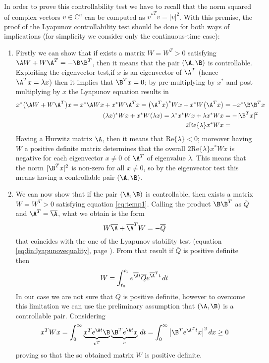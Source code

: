 	In order to prove this controllability test we have to recall that the norm squared of complex vectors $v \in \mathds C^n$ can be computed as ${v^*}^T v = |v|^2$. With this premise, the proof of the Lyapunov controllability test should be done for both ways of  implications (for simplicity we consider only the continuous-time case):
	\begin{enumerate}[\itshape i)]
		\item Firstly we can show that if exists a matrix $W = W^T > 0$ satisfying $\A W + W \A^T = - \B \B^T$, then it means that the pair $(\A,\B)$ is controllable. Exploiting the eigenvector test,if $x$ is an eigenvector of $\A^T$ (hence $\A^T x = \lambda x$) then it implies that $\B^T x = 0$; by pre-multiplying by $x^*$ and post multiplying by $x$ the Lyapunov equation results in 
		\begin{align*}
			x^* \big(\A W + W \A^T\big) x = x^* \A W x + x^* W \A^T x = \big(\A^T x\big)^* W x + x^* W\big(\A^T x\big) & = - x^* \B \B^T x \\
			(\lambda x)^* W x + x^* W (\lambda x) = \lambda^* x^* W x + \lambda x^* W x & = - |\B^T x|^2 \\
			2 \textrm{Re}\{\lambda\} x^* W x & =
		\end{align*}
		Having a Hurwitz matrix $\A$, then it means that $\textrm{Re}\{\lambda\} < 0$; moreover having $W$ a positive definite matrix determines that the overall $2 \textrm{Re}\{\lambda\} x^* W x$ is negative for each eigenvector $x \neq 0$ of $\A^T$ of eigenvalue $\lambda$. This means that the norm $|\B^T x|^2$ is non-zero for all $x\neq 0$, so by the eigenvector test this means having a controllable pair $(\A,\B)$.
		
		\item We can now show that if the pair $(\A,\B)$ is controllable, then exists a matrix $W = W^T > 0$ satisfying equation \ref{eq:temp1}. Calling the product $\B \B^T$ as $\overline Q$ and $\A^T = \overline \A$, what we obtain is the form
		\[ W \overline \A + \overline \A^T W = - \overline Q \]
		that coincides with the one of the Lyapunov stability test (equation \ref{eq:lin:lyapunovequality}, page \pageref{eq:lin:lyapunovequality}). From that result if $\overline Q$ is positive definite then
		\[ W = \int_{t_0}^{t_1} e^{\overline \A t} \overline Q e^{\overline \A^T t} \, dt \]
		In our case we are not sure that $\overline Q$ is positive definite, however to overcome this limitation we can use the preliminary assumption that $(\A,\B)$ is a controllable pair. Considering
		\[ x^T W x = \int_0^\infty \underbrace{x^T e^{\A t} \B}_{v^T} \underbrace{\B^T e^{\A t} x}_v \, dt = \int_0^\infty \big|\B^T e^{\A^T t} x\big|^2\, dx \geq 0 \]
		proving so that the so obtained matrix $W$ is positive definite.		
	\end{enumerate}
	
